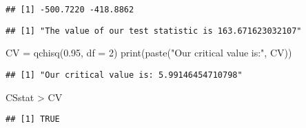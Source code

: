 \documentclass[
]{article}
\newenvironment{Shaded}{\begin{snugshade}}{\end{snugshade}}
\newcommand{\AttributeTok}[1]{\textcolor[rgb]{0.77,0.63,0.00}{#1}}
\newcommand{\DecValTok}[1]{\textcolor[rgb]{0.00,0.00,0.81}{#1}}
\newcommand{\FloatTok}[1]{\textcolor[rgb]{0.00,0.00,0.81}{#1}}
\newcommand{\FunctionTok}[1]{\textcolor[rgb]{0.00,0.00,0.00}{#1}}
\newcommand{\NormalTok}[1]{#1}
\newcommand{\OtherTok}[1]{\textcolor[rgb]{0.56,0.35,0.01}{#1}}
\newcommand{\SpecialCharTok}[1]{\textcolor[rgb]{0.00,0.00,0.00}{#1}}
\newcommand{\StringTok}[1]{\textcolor[rgb]{0.31,0.60,0.02}{#1}}
\begin{document}
\begin{Shaded}
\end{Shaded}

\begin{verbatim}
## [1] -500.7220 -418.8862
\end{verbatim}

\begin{Shaded}
\end{Shaded}

\begin{verbatim}
## [1] "The value of our test statistic is 163.671623032107"
\end{verbatim}

\begin{Shaded}
\begin{Highlighting}[]
\NormalTok{CV }\OtherTok{=} \FunctionTok{qchisq}\NormalTok{(}\FloatTok{0.95}\NormalTok{, }\AttributeTok{df =} \DecValTok{2}\NormalTok{)}
\FunctionTok{print}\NormalTok{(}\FunctionTok{paste}\NormalTok{(}\StringTok{"Our critical value is:"}\NormalTok{, CV))}
\end{Highlighting}
\end{Shaded}

\begin{verbatim}
## [1] "Our critical value is: 5.99146454710798"
\end{verbatim}

\begin{Shaded}
\begin{Highlighting}[]
\NormalTok{CSstat }\SpecialCharTok{\textgreater{}}\NormalTok{ CV}
\end{Highlighting}
\end{Shaded}

\begin{verbatim}
## [1] TRUE
\end{verbatim}
\end{document}

